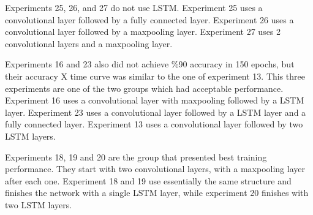 Experiments 25, 26, and 27 do not use LSTM. Experiment 25 uses a convolutional layer followed by a fully connected layer. Experiment 26 uses a convolutional layer followed by a maxpooling layer. Experiment 27 uses 2 convolutional layers and a maxpooling layer.



Experiments 16 and 23 also did not achieve \%90 accuracy in 150 epochs, but their accuracy X time curve was similar to the one of experiment 13. This three experiments are one of the two groups which had acceptable performance.
Experiment 16 uses a convolutional layer with maxpooling followed by a LSTM layer. Experiment 23 uses a convolutional layer followed by a LSTM layer and a fully connected layer.
Experiment 13 uses a convolutional layer followed by two LSTM layers.


Experiments 18, 19 and 20 are the group that presented best training performance. They start with two convolutional layers, with a maxpooling layer after each one. Experiment 18 and 19 use essentially the same structure and finishes the network with a single LSTM layer, while experiment 20 finishes with two LSTM layers.


